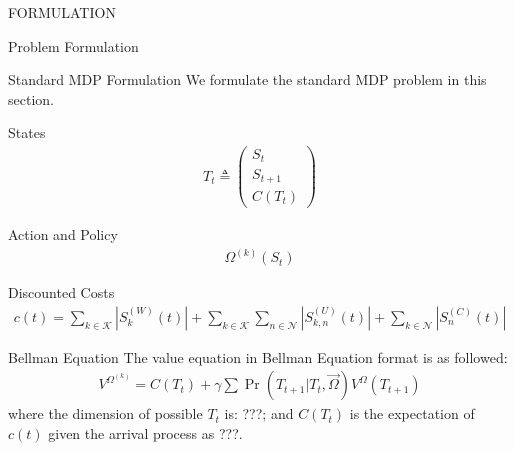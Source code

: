 \documentclass[10pt, conference, letterpaper]{IEEEtran}
\begin{document}
\begin{section}{FORMULATION}
\begin{subsection}{Problem Formulation}
        \end{subsection}

        \begin{subsection}{Standard MDP Formulation}
            We formulate the standard MDP problem in this section.

            \begin{subsubsection}{States}
                \begin{align}
                    T_t \triangleq \begin{pmatrix}
                        S_t \\ S_{t+1} \\ C(T_t)
                    \end{pmatrix}
                \end{align}
            \end{subsubsection}

            \begin{subsubsection}{Action and Policy}
                \begin{align}
                    \Omega^{(k)}(S_t)
                \end{align}
            \end{subsubsection}

            \begin{subsubsection}{Discounted Costs}
                \begin{align}
                    c(t) = \sum_{k \in \mathcal{K}}{|S^{(W)}_{k}(t)|}
                        + \sum_{k \in \mathcal{K}}\sum_{n \in \mathcal{N}}{|S^{(U)}_{k,n}(t)|}
                        + \sum_{k \in \mathcal{N}}{|S^{(C)}_{n}(t)|}
                \end{align}
            \end{subsubsection}

            \begin{subsubsection}{Bellman Equation}
                The value equation in Bellman Equation format is as followed:
                \begin{align}
                    V^{\Omega^{(k)}} = C(T_t) + \gamma \sum \Pr(T_{t+1}|T_{t}, \vec{\Omega}) V^{\Omega}(T_{t+1})
                \end{align}
                where the dimension of possible $T_t$ is: ???; and $C(T_t)$ is the expectation of $c(t)$ given the arrival process as ???.
            \end{subsubsection}
        \end{subsection}
        
    \end{section}
\end{document}
